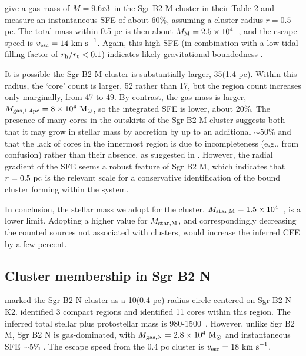 \documentclass[twocolumn]{aastex62}
\begin{document}

\citet{Schmiedeke2016a} give a gas mass of $M=9.6\ee{3}$~\msun in the Sgr B2 M
cluster in their Table 2 and measure an instantaneous SFE of about 60\%, assuming
a cluster radius $r=0.5$ pc.  The total mass within 0.5 pc is then about $M_{\rm M} =
2.5\times10^{4}$~\msun, and the escape speed is $v_{\rm esc}=14~\textrm{km~s}^{-1}$. Again, this
high SFE (in combination with a low tidal filling factor of $r_{\rm h}/r_{\rm
t}<0.1$) indicates likely gravitational boundedness
\citep[e.g.][]{Baumgardt2007a,Kruijssen2012b}.



It is possible the Sgr B2 M cluster is substantially larger, 35\arcsec (1.4 pc).
Within this radius, the `core' count is larger, 52 rather than 17, but the \hii
region count increases only marginally, from 47 to 49.  By contrast,
the gas mass is larger, $M_{\rm gas,1.4pc} = 8\times10^{4}~\mathrm{M}_{\odot}$, so the integrated SFE is lower,
about 20\%.  
The presence of many cores in the outskirts of the Sgr B2 M cluster suggests
both that it may grow in stellar mass by accretion by up to an additional
$\sim50\%$ and that the lack of cores in the innermost region is due to
incompleteness (e.g., from confusion) rather than their absence, as suggested
in \citet{Ginsburg2018a}. However, the radial gradient of the SFE seems a
robust feature of Sgr B2 M, which indicates that $r=0.5~\mathrm{pc}$ is the relevant
scale for a conservative identification of the bound cluster forming within the
system.

In conclusion, the stellar mass we adopt for the cluster, $M_{\rm star,M}=1.5\times10^{4}$~\msun, is
a lower limit.  Adopting a higher value for $M_{\rm star,M}$, and correspondingly decreasing
the counted sources not associated with clusters, would increase the inferred
CFE by a few percent.

\subsection{Cluster membership in Sgr B2 N}
\citet{Schmiedeke2016a} marked the Sgr B2 N cluster as a 10\arcsec  (0.4 pc) radius circle
centered on Sgr B2 N K2.  \citet{Schmiedeke2016a} identified 3 compact \hii regions
and \citet{Ginsburg2018a} identified 11 cores within this region.  The inferred
total stellar plus protostellar mass is 980-1500~\msun.  However, unlike Sgr B2
M, Sgr B2 N is gas-dominated, with $M_{\rm gas,N} = 2.8\times10^{4}~\mathrm{M}_{\odot}$ and
instantaneous SFE $\sim5\%$ \citep{Schmiedeke2016a}.  The escape speed from the
0.4 pc cluster is
$v_{\rm esc} = 18~\textrm{km~s}^{-1}$.
\end{document}
